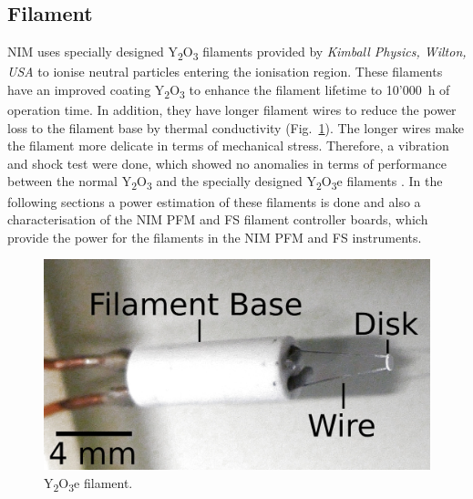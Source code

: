 	\subsection{Filament}
		NIM uses specially designed Y\textsubscript{2}O\textsubscript{3} filaments provided by \textit{Kimball Physics, Wilton, USA} to ionise neutral particles entering the ionisation region. These filaments have an improved coating Y\textsubscript{2}O\textsubscript{3} to enhance the filament lifetime to 10'000~h of operation time. In addition, they have longer filament wires to reduce the power loss to the filament base by thermal conductivity (Fig.~\ref{fig:Y2O3Fil}). The longer wires make the filament more delicate in terms of mechanical stress. Therefore, a vibration and shock test were done, which showed no anomalies in terms of performance between the normal Y\textsubscript{2}O\textsubscript{3} and the specially designed Y\textsubscript{2}O\textsubscript{3}e filaments \cite{Diss_Fausch}. In the following sections a power estimation of these filaments is done and also a characterisation of the NIM PFM and FS filament controller boards, which provide the power for the filaments in the NIM PFM and FS instruments.
		\begin{figure}[h]
			\centering
			\includegraphics[width=.5\textwidth]{Bilder/Y2O3_filament.png}
			\caption{Y\textsubscript{2}O\textsubscript{3}e filament.}
			\label{fig:Y2O3Fil}
		\end{figure}
		


